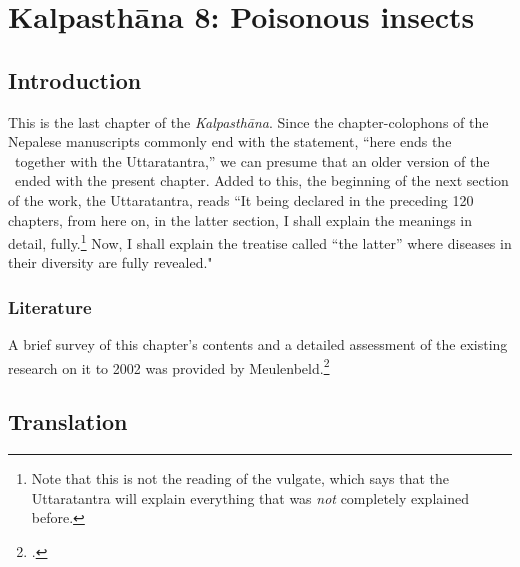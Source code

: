 \chapter{Kalpasthāna 8: Poisonous insects}

\section{Introduction} 

This is the last chapter of the \emph{Kalpasthāna}.  Since the
chapter-colophons of the Nepalese manuscripts commonly end with the
statement, “here ends the \SS\ together with the Uttaratantra,” we can
presume that an older version of the \SS\ ended with the present
chapter.  Added to this, the beginning of the next section of the
work, the Uttaratantra, reads “It being declared in the preceding 120
chapters, from here on, in the latter section, I shall explain the
meanings in detail, fully.\footnote{Note that this is not the reading
    of the vulgate, which says that the Uttaratantra will explain
    everything that was \emph{not} completely explained before.}  Now, I
    shall explain the treatise called “the latter” where diseases
    in their diversity are fully revealed."
    
    

\subsection{Literature} 
A brief survey of this chapter's contents and a detailed assessment of
the existing research on it to 2002 was provided by
Meulenbeld.\footcite[IA, 296--299]{meul-hist} 


\section{Translation}



